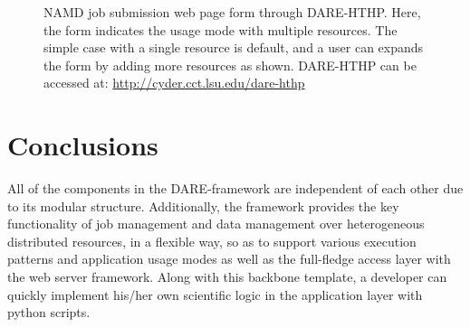 \documentclass{sig-alternate}
\begin{document}
\begin{figure}
 \centering
\caption{\small NAMD job submission web page form through
  DARE-HTHP. Here, the form indicates the usage mode with multiple
  resources.  The simple case with a single resource is default, and a
  user can expands the form by adding more resources as shown.
  DARE-HTHP can be accessed at:
  \url{http://cyder.cct.lsu.edu/dare-hthp} }
  \label{fig:NAMD2}
\end{figure}


\section{Conclusions}

All of the components in the DARE-framework are independent of each
other due to its modular structure.  Additionally, the framework
provides the key functionality of job management and data management
over heterogeneous distributed resources, in a flexible way, so as to
support various execution patterns and application usage modes as well
as the full-fledge access layer with the web server framework.  Along
with this backbone template, a developer can quickly implement his/her
own scientific logic in the application layer with python scripts.
\end{document}
